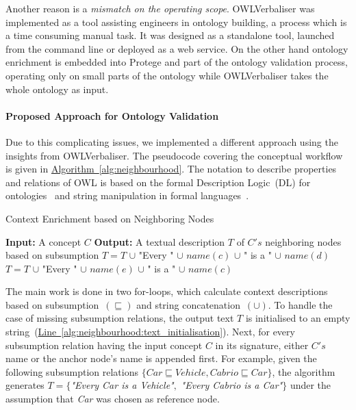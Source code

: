 \documentclass[draft,final]{vutinfth} %
\begin{document}
Another reason is a \emph{mismatch on the operating scope}. OWLVerbaliser was implemented as a tool assisting engineers in ontology building, a process which is a time consuming manual task. It was designed as a standalone tool, launched from the command line or deployed as a web service. On the other hand ontology enrichment is embedded into Protege and part of the ontology validation process, operating only on small parts of the ontology while OWLVerbaliser takes the whole ontology as input. 

\paragraph{Proposed Approach for Ontology Validation} Due to this complicating issues, we implemented a different approach using the insights from OWLVerbaliser. The pseudocode covering the conceptual workflow is given in \hyperref[alg:neighbourhood]{Algorithm~\ref*{alg:neighbourhood}}. The notation to describe properties and relations of OWL is based on the formal Description Logic~(DL) for ontologies~\cite{baader2003} and string manipulation in formal languages~\cite{hopcroft1969}.

\begin{algorithm}
	\caption{Context Enrichment based on Neighboring Nodes}\label{alg:neighbourhood}
	\begin{algorithmic}[1]
		\newline
			\textbf{Input:} A concept $C$\newline
			\textbf{Output:} A textual description $T$ of $C's$ neighboring nodes based on subsumption\newline
			 \label{alg:neighbourhood:text_initialisation}
				\State $T=T$ $\cup$ "Every " $\cup$ $name(c)$ $\cup$ " is a " $\cup$ $name(d)$
			\EndFor
				\State $T=T$ $\cup$ "Every " $\cup$ $name(e)$ $\cup$ " is a " $\cup$ $name(c)$
			\EndFor
		\EndProcedure
	\end{algorithmic}
\end{algorithm}

The main work is done in two for-loops, which calculate context descriptions based on subsumption~$(\sqsubseteq)$ and string concatenation~$(\cup)$. To handle the case of missing subsumption relations, the output text $T$ is initialised to an empty string~(\hyperref[alg:neighbourhood:text_initialisation]{Line~\ref*{alg:neighbourhood:text_initialisation}}). Next, for every subsumption relation having the input concept $C$ in its signature, either $C's$ name or the anchor node's name is appended first. For example, given the following subsumption relations $\{Car \sqsubseteq Vehicle, Cabrio \sqsubseteq Car\}$, the algorithm generates $T=\{$\textit{"Every Car is a Vehicle"}$,$ \textit{"Every Cabrio is a Car"}$\}$ under the assumption that \textit{Car} was chosen as reference node.  
\end{document}

